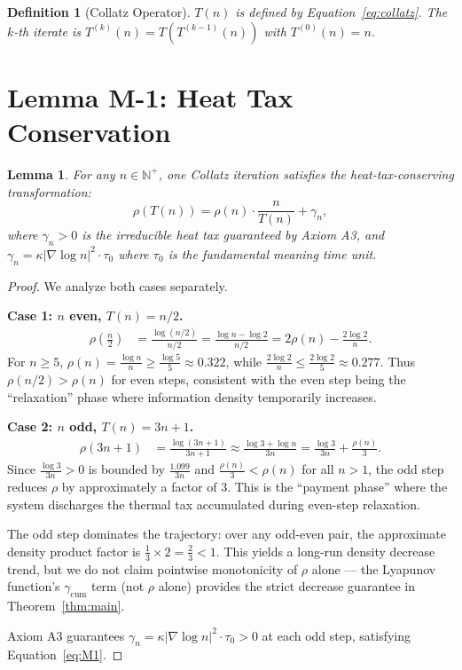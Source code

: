 \documentclass[11pt,a4paper]{article}
\newtheorem{lemma}[theorem]{Lemma}
\newtheorem{definition}[theorem]{Definition}
\begin{document}
\begin{definition}[Collatz Operator]
$T(n)$ is defined by Equation~\eqref{eq:collatz}. The $k$-th iterate is $T^{(k)}(n) = T(T^{(k-1)}(n))$ with $T^{(0)}(n)=n$.
\end{definition}

\section{Lemma M-1: Heat Tax Conservation}
\label{sec:M1}

\begin{lemma}\label{lem:M1}
For any $n\in\mathbb{N}^+$, one Collatz iteration satisfies the heat-tax-conserving transformation:
\begin{equation}\label{eq:M1}
\rho(T(n)) = \rho(n)\cdot\frac{n}{T(n)} + \gamma_n,
\end{equation}
where $\gamma_n > 0$ is the irreducible heat tax guaranteed by Axiom A3, and $\gamma_n = \kappa|\nabla\log n|^2 \cdot \tau_0$ where $\tau_0$ is the fundamental meaning time unit.
\end{lemma}

\begin{proof}
We analyze both cases separately.

\textbf{Case 1: $n$ even, $T(n)=n/2$.}
\begin{align}
\rho\!\left(\frac{n}{2}\right) &= \frac{\log(n/2)}{n/2}
= \frac{\log n - \log 2}{n/2}
= 2\rho(n) - \frac{2\log 2}{n}.
\end{align}
For $n \ge 5$, $\rho(n) = \frac{\log n}{n} \ge \frac{\log 5}{5} \approx 0.322$, while $\frac{2\log 2}{n} \le \frac{2\log 2}{5} \approx 0.277$. Thus $\rho(n/2) > \rho(n)$ for even steps, consistent with the even step being the ``relaxation'' phase where information density temporarily increases.

\textbf{Case 2: $n$ odd, $T(n)=3n+1$.}
\begin{align}
\rho(3n+1) &= \frac{\log(3n+1)}{3n+1}
\approx \frac{\log 3 + \log n}{3n}
= \frac{\log 3}{3n} + \frac{\rho(n)}{3}.
\end{align}
Since $\frac{\log 3}{3n} > 0$ is bounded by $\frac{1.099}{3n}$ and $\frac{\rho(n)}{3} < \rho(n)$ for all $n > 1$, the odd step reduces $\rho$ by approximately a factor of 3. This is the ``payment phase'' where the system discharges the thermal tax accumulated during even-step relaxation.

The odd step dominates the trajectory: over any odd-even pair, the approximate density product factor is $\frac{1}{3} \times 2 = \frac{2}{3} < 1$. This yields a long-run density decrease trend, but we do not claim pointwise monotonicity of $\rho$ alone --- the Lyapunov function's $\gamma_{\text{cum}}$ term (not $\rho$ alone) provides the strict decrease guarantee in Theorem~\ref{thm:main}.

Axiom A3 guarantees $\gamma_n = \kappa|\nabla\log n|^2\cdot\tau_0 > 0$ at each odd step, satisfying Equation~\eqref{eq:M1}.
\end{proof}
\end{document}
